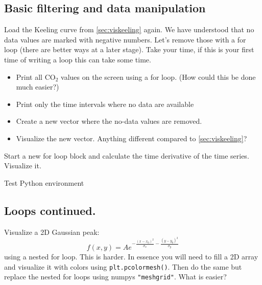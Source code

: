 \subsection{Basic filtering and data manipulation}
\label{sec:loops}
Load the Keeling curve from \ref{sec:viskeeling} again. We have understood that no data values are marked with negative numbers. Let's remove those with a for loop (there are better ways at a later stage). Take your time, if this is your first time of writing a loop this can take some time.
\begin{itemize}
  \item Print all CO$_2$ values on the screen using a for loop. (How could this be done much easier?)
  \item Print only the time intervals where no data are available
  \item Create a new vector where the no-data values are removed.
  \item Visualize the new vector. Anything different compared to \ref{sec:viskeeling}?
\end{itemize}
Start a new for loop block and calculate the time derivative of the time series. Visualize it. 
\ifanswers
\begin{tcolorbox}[enhanced jigsaw,breakable,pad at break*=1mm,
  colback=blue!5!white,colframe=babyblueeyes,title=Solutions,
  watermark color=white]
  Test Python environment
  
\end{tcolorbox}
\fi
\subsection{Loops continued.}
Visualize a 2D Gaussian peak:
$$
f(x,y) = Ae^{-\frac{(x-x_0)^2}{\sigma_x}-\frac{(y-y_0)^2}{\sigma_y}}
$$
using a nested for loop. This is harder. In essence you will need to fill a 2D array and visualize it with colors using \verb|plt.pcolormesh()|. Then do the same but replace the nested for loops using numpys \verb|"meshgrid"|. What is easier?
